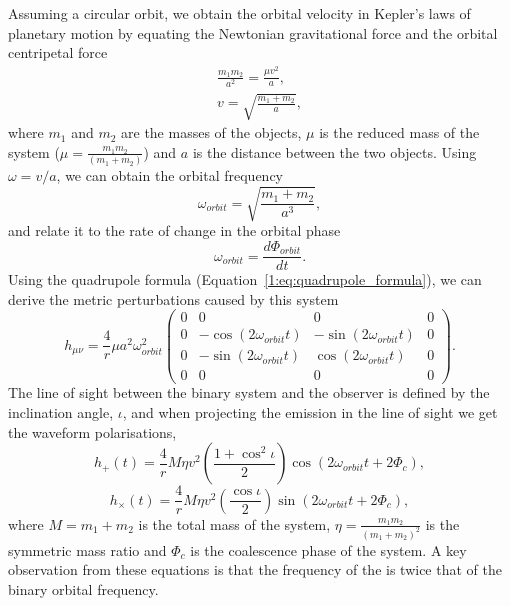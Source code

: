 Assuming a circular orbit, we obtain the orbital velocity in Kepler's laws of planetary motion by equating the Newtonian gravitational force and the orbital centripetal force
%
\begin{align}
    \frac{m_{1} m_{2}}{a^{2}} = \frac{\mu v^{2}}{a}, \\
    v = \sqrt{\frac{m_{1} + m_{2}}{a}},
\end{align}
%
where $m_{1}$ and $m_{2}$ are the masses of the objects, $\mu$ is the reduced mass of the system ($\mu = \frac{m_1m_2}{(m_1+m_2)}$) and $a$ is the distance between the two objects.
%
Using $\omega = v/a$, we can obtain the orbital frequency
%
\begin{equation}
    \omega_{orbit} = \sqrt{\frac{m_{1} + m_{2}}{a^{3}}},
    \label{1:eq:omega_orbit}
\end{equation}
%
and relate it to the rate of change in the orbital phase
%
\begin{equation}
    \omega_{orbit} = \frac{d \Phi_{orbit}}{dt}.
\end{equation}
%
Using the quadrupole formula (Equation~\ref{1:eq:quadrupole_formula}), we can derive the metric perturbations caused by this system
%
\begin{equation}
    h_{\mu\nu} = \frac{4}{r} \mu a^{2} \omega^{2}_{orbit}
    \begin{pmatrix}
      0 & 0 & 0 & 0 \\
      0 & -\cos\left(2\omega_{orbit}t\right) & -\sin\left(2\omega_{orbit}t\right) & 0 \\
      0 & -\sin\left(2\omega_{orbit}t\right) & \cos\left(2\omega_{orbit}t\right) & 0 \\
      0 & 0 & 0 & 0
   \end{pmatrix}.
\end{equation}
%
The line of sight between the binary system and the observer is defined by the inclination angle, $\iota$, and when projecting the \gwadj emission in the line of sight we get the waveform polarisations,
%
\begin{equation}
    h_{+}(t) = \frac{4}{r} M\eta v^{2} \left(\frac{1 + \cos^{2}\iota}{2}\right)\cos\left(2\omega_{orbit}t+2\Phi_{c}\right),
\end{equation}
%
\begin{equation}
    h_{\times}(t) = \frac{4}{r} M\eta v^{2} \left(\frac{\cos\iota}{2}\right)\sin\left(2\omega_{orbit}t+2\Phi_{c}\right),
\end{equation}
%
where $M = m_1 + m_2$ is the total mass of the system, $\eta = \frac{m_{1}m_{2}}{(m_{1} + m_{2})^{2}}$ is the symmetric mass ratio and $\Phi_{c}$ is the coalescence phase of the system. A key observation from these equations is that the frequency of the \gws is twice that of the binary orbital frequency.

